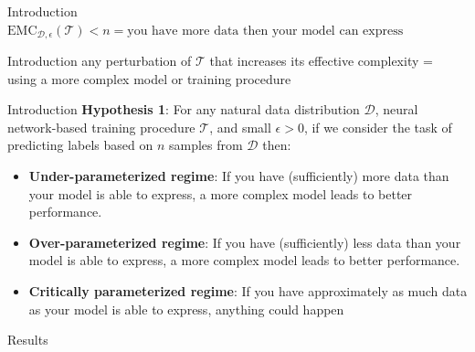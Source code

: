 \documentclass[8pt]{beamer}
\begin{document}
	\begin{frame}{Introduction}
		\centering
		$\mathrm{EMC}_{\mathcal{D},\epsilon}(\mathcal{T}) < n = \textrm{you have more data then your model can express}$
	\end{frame}

	\begin{frame}{Introduction}
		\centering
		any perturbation of $\mathcal{T}$ that increases its effective complexity = \\
		using a more complex model or training procedure
	\end{frame}

	\begin{frame}{Introduction}
		\textbf{Hypothesis 1}: For any natural data distribution $\mathcal{D}$, neural network-based training procedure $\mathcal{T}$, and small $\epsilon>0$, if we consider the task of predicting labels based on $n$ samples from $\mathcal{D}$ then:
		\begin{itemize}
			\item \textbf{Under-parameterized regime}: If you have (sufficiently) more data than your model is able to express, a more complex model leads to better performance.
			\item \textbf{Over-parameterized regime}: If you have (sufficiently) less data than your model is able to express, a more complex model leads to better performance.
			\item \textbf{Critically parameterized regime}: If you have approximately as much data as your model is able to express, anything could happen
		\end{itemize}
	\end{frame}

	\begin{frame}{Results}
		\centering
		\vfill
		\vfill
	\end{frame}
\end{document}
